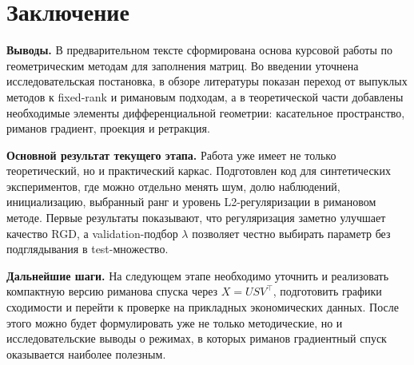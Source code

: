 \documentclass[a4paper,12pt]{article}
\begin{document}
\newpage

\section*{Заключение}
{}

\textbf{Выводы.} В предварительном тексте сформирована основа курсовой работы по геометрическим методам для заполнения матриц. Во введении уточнена исследовательская постановка, в обзоре литературы показан переход от выпуклых методов к fixed-rank и римановым подходам, а в теоретической части добавлены необходимые элементы дифференциальной геометрии: касательное пространство, риманов градиент, проекция и ретракция.

\textbf{Основной результат текущего этапа.} Работа уже имеет не только теоретический, но и практический каркас. Подготовлен код для синтетических экспериментов, где можно отдельно менять шум, долю наблюдений, инициализацию, выбранный ранг и уровень L2-регуляризации в римановом методе. Первые результаты показывают, что регуляризация заметно улучшает качество RGD, а validation-подбор $\lambda$ позволяет честно выбирать параметр без подглядывания в test-множество.

\textbf{Дальнейшие шаги.} На следующем этапе необходимо уточнить и реализовать компактную версию риманова спуска через $X=USV^\top$, подготовить графики сходимости и перейти к проверке на прикладных экономических данных. После этого можно будет формулировать уже не только методические, но и исследовательские выводы о режимах, в которых риманов градиентный спуск оказывается наиболее полезным.
\end{document}
